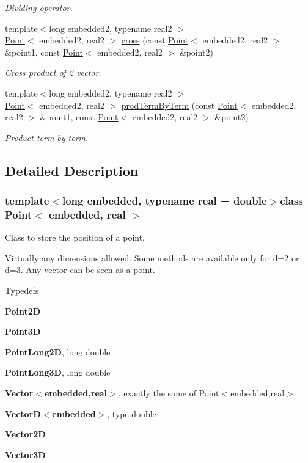 \begin{DoxyCompactItemize}
\begin{DoxyCompactList}\small\item\em \-Dividing operator. \end{DoxyCompactList}\item 
{\footnotesize template$<$long embedded2, typename real2 $>$ }\\\hyperlink{class_point}{\-Point}$<$ embedded2, real2 $>$ \hyperlink{class_point_a951dd5bf519f7daabc4ba4e61657cc26}{cross} (const \hyperlink{class_point}{\-Point}$<$ embedded2, real2 $>$ \&point1, const \hyperlink{class_point}{\-Point}$<$ embedded2, real2 $>$ \&point2)
\begin{DoxyCompactList}\small\item\em \-Cross product of 2 vector. \end{DoxyCompactList}\item 
{\footnotesize template$<$long embedded2, typename real2 $>$ }\\\hyperlink{class_point}{\-Point}$<$ embedded2, real2 $>$ \hyperlink{class_point_a94ebaad0db80d547a452cba37e98e1ca}{prod\-Term\-By\-Term} (const \hyperlink{class_point}{\-Point}$<$ embedded2, real2 $>$ \&point1, const \hyperlink{class_point}{\-Point}$<$ embedded2, real2 $>$ \&point2)
\begin{DoxyCompactList}\small\item\em \-Product term by term. \end{DoxyCompactList}\end{DoxyCompactItemize}


\subsection{\-Detailed \-Description}
\subsubsection*{template$<$long embedded, typename real = double$>$class Point$<$ embedded, real $>$}

\-Class to store the position of a point. 

\-Virtually any dimensions allowed. \-Some methods are available only for d=2 or d=3. \-Any vector can be seen as a point.

\-Typedefs
\begin{DoxyItemize}
\item {\bfseries \-Point2\-D}
\item {\bfseries \-Point3\-D}
\item {\bfseries \-Point\-Long2\-D}, long double
\item {\bfseries \-Point\-Long3\-D}, long double
\item {\bfseries \-Vector$<$embedded,real$>$}, exactly the same of \-Point$<$embedded,real$>$
\item {\bfseries \-Vector\-D$<$embedded$>$}, type double
\item {\bfseries \-Vector2\-D}
\item {\bfseries \-Vector3\-D} 
\end{DoxyItemize}

